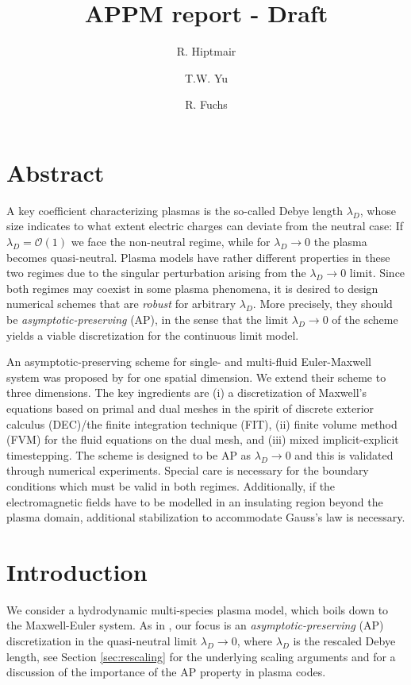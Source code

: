 \documentclass{article}
\title{APPM report - Draft}
\author[1]{R. Hiptmair}
\author[1]{T.W. Yu}
\author[2]{R. Fuchs}
\affil[1]{Seminar for Applied Mathematics , ETH Z\"{u}rich}
\affil[2]{IET Institut für Energietechnik, OST}
\date{}
\begin{document}
\maketitle

\section*{Abstract}
A key coefficient characterizing plasmas is the so-called Debye length $\lambda_D$, whose size indicates to what extent electric charges can deviate from the neutral case: If $\lambda_D = \mathcal{O}(1)$ we face the non-neutral regime, while for $\lambda_D\to 0$ the plasma becomes quasi-neutral. Plasma models have rather different properties in these two regimes due to the singular perturbation arising from the $\lambda_D\to 0$ limit.
Since both regimes may coexist in some plasma phenomena, it is desired to design numerical schemes that are \emph{robust} for arbitrary $\lambda_D$. More precisely, they should be \emph{asymptotic-preserving} (AP), in the sense that the limit $\lambda_D\to 0$ of the scheme yields a viable discretization for the continuous limit model.

An asymptotic-preserving scheme for single- and multi-fluid Euler-Maxwell system was proposed by \cite{degond_2012} for one spatial dimension. We extend their scheme to three dimensions. The key ingredients are (i) a discretization of Maxwell's equations based on primal and dual meshes in the spirit of discrete exterior calculus (DEC)/the finite integration technique (FIT), (ii) finite volume method (FVM) for the fluid equations on the dual mesh, and (iii) mixed implicit-explicit timestepping. The scheme is designed to be AP as $\lambda_D \rightarrow 0$ and this is validated through numerical experiments. Special care is necessary for the boundary conditions which must be valid in both regimes. Additionally, if the electromagnetic fields have to be modelled in an insulating region beyond the plasma domain, additional stabilization to accommodate Gauss's law is necessary.

\section{Introduction}
We consider a hydrodynamic multi-species plasma model, which boils down to the Maxwell-Euler system. As in \cite{degond_2012}, our focus is an \emph{asymptotic-preserving} (AP) discretization in the quasi-neutral limit $\lambda_D \rightarrow 0$, where $\lambda_D$ is the rescaled Debye length, see Section \ref{sec:rescaling} for the underlying scaling arguments and \cite{degond_2012,degond_2017} for a discussion of the importance of the AP property in plasma codes.  
\end{document}
